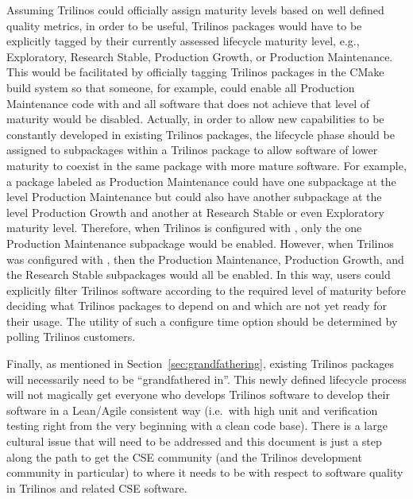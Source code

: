 \documentclass[11pt]{SANDreport}
\begin{document}
Assuming Trilinos could officially assign maturity levels based on
well defined quality metrics, in order to be useful, Trilinos packages
would have to be explicitly tagged by their currently assessed
lifecycle maturity level, e.g., Exploratory, Research Stable,
Production Growth, or Production Maintenance.  This would be
facilitated by officially tagging Trilinos packages in the CMake build
system so that someone, for example, could enable all Production
Maintenance code with
{} and all software that does not achieve that
level of maturity would be disabled.  Actually, in order to allow new
capabilities to be constantly developed in existing Trilinos packages,
the lifecycle phase should be assigned to subpackages within a
Trilinos package to allow software of lower maturity to coexist in the
same package with more mature software.  For example, a package
labeled as Production Maintenance could have one subpackage at the
level Production Maintenance but could also have another subpackage at
the level Production Growth and another at Research Stable or even
Exploratory maturity level.  Therefore, when Trilinos is configured
with {}, only the one Production Maintenance
subpackage would be enabled.  However, when Trilinos was configured
with {}, then the Production Maintenance, Production Growth,
and the Research Stable subpackages would all be enabled.  In this
way, users could explicitly filter Trilinos software according to the
required level of maturity before deciding what Trilinos packages to
depend on and which are not yet ready for their usage.  The utility of
such a configure time option should be determined by polling Trilinos
customers.

Finally, as mentioned in Section~\ref{sec:grandfathering}, existing
Trilinos packages will necessarily need to be ``grandfathered in''.
This newly defined lifecycle process will not magically get everyone
who develops Trilinos software to develop their software in a
Lean/Agile consistent way (i.e.\ with high unit and verification
testing right from the very beginning with a clean code base).  There
is a large cultural issue that will need to be addressed and this
document is just a step along the path to get the CSE community (and
the Trilinos development community in particular) to where it needs to
be with respect to software quality in Trilinos and related CSE
software.
\end{document}

